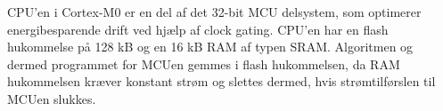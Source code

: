 CPU'en i Cortex-M0 er en del af det 32-bit MCU delsystem, som optimerer energibesparende drift ved hjælp af clock gating. %
CPU'en har en flash hukommelse på 128 kB og en 16 kB RAM af typen SRAM. Algoritmen og dermed programmet for MCUen gemmes i flash hukommelsen, da RAM hukommelsen kræver konstant strøm og slettes dermed, hvis strømtilførslen til MCUen slukkes. \citep{Semiconductor20164200M}
%
